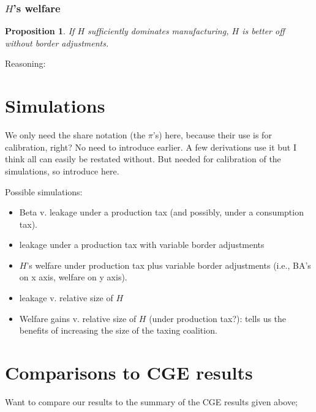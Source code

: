 \documentclass[notitlepage,12pt]{article}
\newtheorem{proposition}[theorem]{Proposition}
\begin{document}
\subsubsection{$H$'s welfare}

\begin{proposition}
If $H$ sufficiently dominates manufacturing, $H$ is better off without
border adjustments.
\end{proposition}

Reasoning:

\section{Simulations}

We only need the share notation (the $\pi $'s) here, because their use is
for calibration, right? No need to introduce earlier. A few derivations use
it but I think all can easily be restated without. But needed for
calibration of the simulations, so introduce here. 

Possible simulations:

\begin{itemize}
\item Beta v. leakage under a production tax (and possibly, under a
consumption tax).

\item leakage under a production tax with variable border adjustments

\item $H$'s welfare under production tax plus variable border adjustments
(i.e., BA's on x axis, welfare on y axis).

\item leakage v. relative size of $H$

\item Welfare gains v. relative size of $H$ (under production tax?): tells
us the benefits of increasing the size of the taxing coalition.
\end{itemize}

\section{Comparisons to CGE results}

Want to compare our results to the summary of the CGE results given above;
\end{document}
